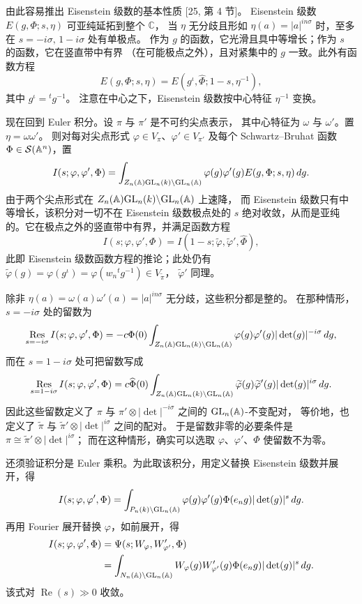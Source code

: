 由此容易推出 Eisenstein 级数的基本性质 [25, 第 4 节]。
Eisenstein 级数 $E(g,\Phi;s,\eta)$ 可亚纯延拓到整个 $\mathbb{C}$，
当 $\eta$ 无分歧且形如 $\eta(a)=|a|^{in\sigma}$ 时，至多在 $s=-i\sigma,\,1-i\sigma$ 处有单极点。
作为 $g$ 的函数，它光滑且具中等增长；作为 $s$ 的函数，它在竖直带中有界
（在可能极点之外），且对紧集中的 $g$ 一致。此外有函数方程
\[
E(g,\Phi;s,\eta)=E(g^\iota,\widehat{\Phi};1-s,\eta^{-1}),
\]
其中 $g^\iota={}^tg^{-1}$。
注意在中心之下，Eisenstein 级数按中心特征 $\eta^{-1}$ 变换。

现在回到 Euler 积分。设 $\pi$ 与 $\pi'$ 是不可约尖点表示，
其中心特征为 $\omega$ 与 $\omega'$。置 $\eta=\omega\omega'$。
则对每对尖点形式 $\varphi\in V_\pi$、$\varphi'\in V_{\pi'}$ 及每个
Schwartz--Bruhat 函数 $\Phi\in\mathcal{S}(\mathbb{A}^n)$，置
\[
I(s;\varphi,\varphi',\Phi)=\int_{Z_n(\mathbb{A})\mathrm{GL}_n(k)\backslash\mathrm{GL}_n(\mathbb{A})}
\varphi(g)\varphi'(g)E(g,\Phi;s,\eta)\,dg.
\]
由于两个尖点形式在 $Z_n(\mathbb{A})\mathrm{GL}_n(k)\backslash\mathrm{GL}_n(\mathbb{A})$ 上速降，
而 Eisenstein 级数只有中等增长，该积分对一切不在 Eisenstein 级数极点处的 $s$
绝对收敛，从而是亚纯的。它在极点之外的竖直带中有界，并满足函数方程
\[
I(s;\varphi,\varphi',\Phi)=I(1-s;\widetilde{\varphi},\widetilde{\varphi}',\widehat{\Phi}),
\]
此即 Eisenstein 级数函数方程的推论；此处仍有
$\widetilde{\varphi}(g)=\varphi(g^\iota)=\varphi(w_n{}^tg^{-1})\in V_{\widetilde{\pi}}$，
$\widetilde{\varphi}'$ 同理。

除非 $\eta(a)=\omega(a)\omega'(a)=|a|^{in\sigma}$ 无分歧，这些积分都是整的。
在那种情形，$s=-i\sigma$ 处的留数为
\[
\operatorname*{Res}_{s=-i\sigma}I(s;\varphi,\varphi',\Phi)
=-c\Phi(0)\int_{Z_n(\mathbb{A})\mathrm{GL}_n(k)\backslash\mathrm{GL}_n(\mathbb{A})}
\varphi(g)\varphi'(g)|\det(g)|^{-i\sigma}\,dg,
\]
而在 $s=1-i\sigma$ 处可把留数写成
\[
\operatorname*{Res}_{s=1-i\sigma}I(s;\varphi,\varphi',\Phi)
=c\widehat{\Phi}(0)\int_{Z_n(\mathbb{A})\mathrm{GL}_n(k)\backslash\mathrm{GL}_n(\mathbb{A})}
\widetilde{\varphi}(g)\widetilde{\varphi}'(g)|\det(g)|^{i\sigma}\,dg.
\]
因此这些留数定义了 $\pi$ 与 $\pi'\otimes|\det|^{-i\sigma}$ 之间的 $\mathrm{GL}_n(\mathbb{A})$-不变配对，
等价地，也定义了 $\widetilde{\pi}$ 与 $\widetilde{\pi}'\otimes|\det|^{i\sigma}$ 之间的配对。
于是留数非零的必要条件是 $\pi\cong\widetilde{\pi}'\otimes|\det|^{i\sigma}$；
而在这种情形，确实可以选取 $\varphi$、$\varphi'$、$\Phi$ 使留数不为零。

还须验证积分是 Euler 乘积。为此取该积分，用定义替换 Eisenstein 级数并展开，得
\[
I(s;\varphi,\varphi',\Phi)=\int_{P_n(k)\backslash\mathrm{GL}_n(\mathbb{A})}
\varphi(g)\varphi'(g)\Phi(e_ng)|\det(g)|^s\,dg.
\]
再用 Fourier 展开替换 $\varphi$，如前展开，得
\[
\begin{aligned}
I(s;\varphi,\varphi',\Phi)&=\Psi(s;W_\varphi,W'_{\varphi'},\Phi)\\
&=\int_{N_n(\mathbb{A})\backslash\mathrm{GL}_n(\mathbb{A})}
W_\varphi(g)W'_{\varphi'}(g)\Phi(e_ng)|\det(g)|^s\,dg.
\end{aligned}
\]
该式对 $\operatorname{Re}(s)\gg0$ 收敛。

